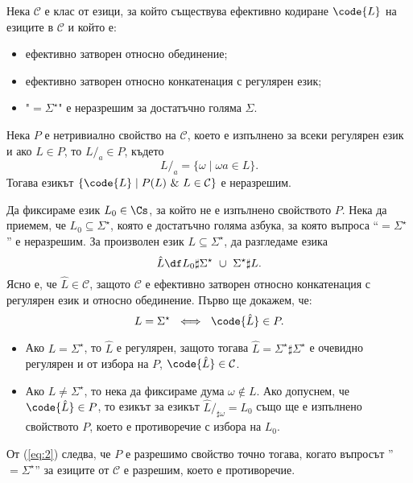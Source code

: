\begin{theorem}[Грейбах 1963]
  Нека $\mathcal{C}$ е клас от езици, за който съществува ефективно кодиране $\code{L}$ на езиците в $\mathcal{C}$ и който е:
  \begin{itemize}
  \item 
    ефективно затворен относно обединение;
  \item
    ефективно затворен относно конкатенация с регулярен език;
  \item
    "$= \Sigma^\star$" е неразрешим за достатъчно голяма $\Sigma$.
  \end{itemize}
  Нека $P$ е нетривиално свойство на $\mathcal{C}$, което е изпълнено за всеки регулярен език и ако $L \in P$,
  то $L/_a \in P$, където
  \[L/_a = \{\omega \mid \omega a \in L\}.\]
  Тогава езикът $\{\code{L} \mid P(L)\ \&\ L \in \mathcal{C}\}$ е неразрешим.
\end{theorem}
\begin{hint}
  Да фиксираме език $L_0 \in \Cs$, за който не е изпълнено свойството $P$.
  Нека да приемем, че $L_0 \subseteq \Sigma^\star$, която е достатъчно голяма азбука, за която
  въпроса ``$= \Sigma^\star$'' е неразрешим.
  За произволен език $L \subseteq \Sigma^\star$, да разгледаме езика
  \[\hat{L} \df L_0 \sharp \Sigma^\star\ \cup\ \Sigma^\star \sharp L.\]
  Ясно е, че $\hat{L}\in \mathcal{C}$, защото $\mathcal{C}$ е ефективно затворен относно конкатенация с регулярен език и относно обединение. 
  Първо ще докажем, че: 
  \begin{equation}
    \label{eq:2}
    L = \Sigma^\star\ \iff\ \code{\hat{L}} \in P.
  \end{equation}

  \begin{itemize}
  \item 
    Ако $L = \Sigma^\star$, то $\hat{L}$ е регулярен, защото тогава
    $\hat{L} = \Sigma^\star \sharp \Sigma^\star$ е очевидно регулярен и от избора на $P$, $\code{\hat{L}} \in \mathcal{C}$.
  \item
    Ако $L \neq \Sigma^\star$, то нека да фиксираме дума $\omega \not\in L$.
    Ако допуснем, че $\code{\hat{L}} \in P$, то езикът
    за езикът $\hat{L}/_{\sharp\omega} = L_0$ също ще е изпълнено свойството $P$, което е противоречие с избора на $L_0$.
  \end{itemize}

  От (\ref{eq:2}) следва, че $P$ е разрешимо свойство точно тогава, когато въпросът ''$=\Sigma^\star$'' за езиците от $\mathcal{C}$ е разрешим, което е противоречие.
\end{hint}


